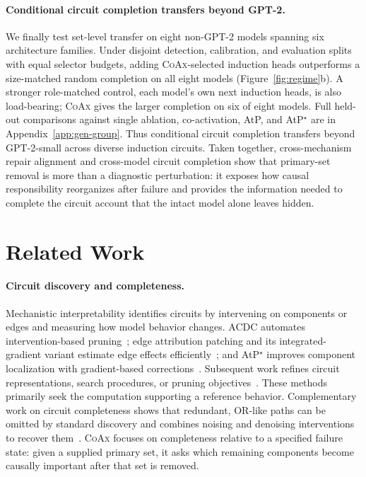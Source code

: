 \documentclass{article} %
\theoremstyle{plain}
\theoremstyle{definition}
\newcommand{\coax}{\textsc{CoAx}\xspace}
\begin{document}
\paragraph{Conditional circuit completion transfers beyond GPT-2.}
We finally test set-level transfer on eight non-GPT-2 models spanning six architecture families.
Under disjoint detection, calibration, and evaluation splits with equal selector budgets, adding \coax-selected induction heads outperforms a size-matched random completion on all eight models (Figure~\ref{fig:regime}b).
A stronger role-matched control, each model's own next induction heads, is also load-bearing; \coax gives the larger completion on six of eight models. Full held-out comparisons against single ablation, co-activation, AtP, and AtP$^\star$ are in Appendix~\ref{app:gen-group}.
Thus conditional circuit completion transfers beyond GPT-2-small across diverse induction circuits.
Taken together, cross-mechanism repair alignment and cross-model circuit completion show that primary-set removal is more than a diagnostic perturbation: it exposes how causal responsibility reorganizes after failure and provides the information needed to complete the circuit account that the intact model alone leaves hidden.

\section{Related Work}
\label{sec:related}

\paragraph{Circuit discovery and completeness.}
Mechanistic interpretability identifies circuits by intervening on components or edges and measuring how model behavior changes.
ACDC automates intervention-based pruning~\citep{conmy2023acdc}; edge attribution patching and its integrated-gradient variant estimate edge effects efficiently~\citep{syed2023attribution,hanna2024faith}; and AtP$^\star$ improves component localization with gradient-based corrections~\citep{kramar2024atp}.
Subsequent work refines circuit representations, search procedures, or pruning objectives~\citep{marks2024sparse,ferrando2024information,hsu2025cdt,bhaskar2024edge}.
These methods primarily seek the computation supporting a reference behavior.
Complementary work on circuit completeness shows that redundant, OR-like paths can be omitted by standard discovery and combines noising and denoising interventions to recover them~\citep{chen2025completeness}.
\coax focuses on completeness relative to a specified failure state: given a supplied primary set, it asks which remaining components become causally important after that set is removed.
\end{document}
